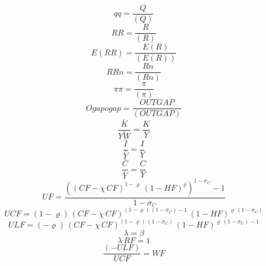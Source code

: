 \begin{dmath}
{qq}=\frac{{Q}}{({Q})}
\end{dmath}
\begin{dmath}
{RR}=\frac{{R}}{({R})}
\end{dmath}
\begin{dmath}
{E(RR)}=\frac{{E(R)}}{({E(R)})}
\end{dmath}
\begin{dmath}
{RRn}=\frac{{Rn}}{({Rn})}
\end{dmath}
\begin{dmath}
{\pi\pi}=\frac{{\pi}}{({\pi})}
\end{dmath}
\begin{dmath}
{Ogapogap}=\frac{{OUTGAP}}{({OUTGAP})}
\end{dmath}
\begin{dmath}
{\frac{\bar{K}}{\bar{YW}}}=\frac{{K}}{{Y}}
\end{dmath}
\begin{dmath}
{\frac{\bar{I}}{\bar{Y}}}=\frac{{I}}{{Y}}
\end{dmath}
\begin{dmath}
{\frac{\bar{C}}{\bar{Y}}}=\frac{{C}}{{Y}}
\end{dmath}
\begin{dmath}
{UF}=\frac{\left(\left({CF}-{{\chi}}\, {CF}\right)^{1-{{\varrho}}}\, \left(1-{HF}\right)^{{{\varrho}}}\right)^{1-{{\sigma_{C}}}}-1}{1-{{\sigma_{C}}}}
\end{dmath}
\begin{dmath}
{UCF}=\left(1-{{\varrho}}\right)\, \left({CF}-{{\chi}}\, {CF}\right)^{\left(1-{{\varrho}}\right)\, \left(1-{{\sigma_{C}}}\right)-1}\, \left(1-{HF}\right)^{{{\varrho}}\, \left(1-{{\sigma_{C}}}\right)}
\end{dmath}
\begin{dmath}
{ULF}=\left(-{{\varrho}}\right)\, \left({CF}-{{\chi}}\, {CF}\right)^{\left(1-{{\varrho}}\right)\, \left(1-{{\sigma_{C}}}\right)}\, \left(1-{HF}\right)^{{{\varrho}}\, \left(1-{{\sigma_{C}}}\right)-1}
\end{dmath}
\begin{dmath}
{\lambda}={{\beta}}
\end{dmath}
\begin{dmath}
{\lambda}\, {RF}=1
\end{dmath}
\begin{dmath}
\frac{\left(-{ULF}\right)}{{UCF}}={WF}
\end{dmath}
